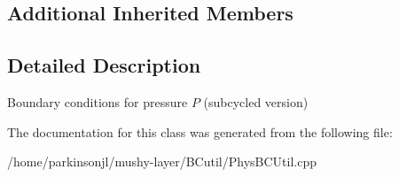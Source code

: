 \subsection*{Additional Inherited Members}


\subsection{Detailed Description}
Boundary conditions for pressure $P$ (subcycled version) 

The documentation for this class was generated from the following file\-:\begin{DoxyCompactItemize}
\item 
/home/parkinsonjl/mushy-\/layer/\-B\-Cutil/Phys\-B\-C\-Util.\-cpp\end{DoxyCompactItemize}
